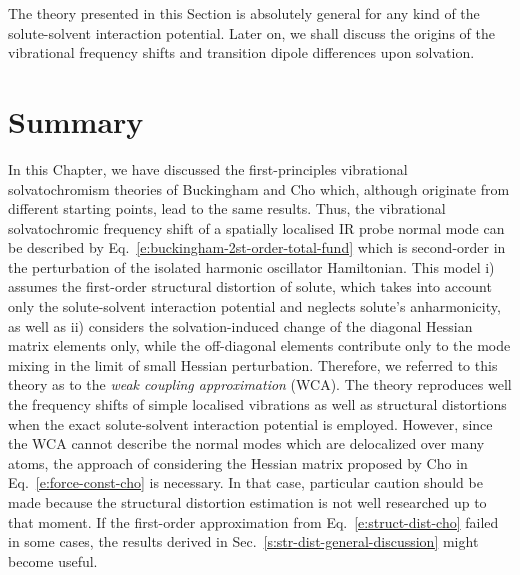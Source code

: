 \documentclass[a4paper,titlepage,twoside,fleqn,12pt]{book}
\begin{document}
\begin{refsection}
The theory presented in this Section is absolutely general 
for any kind of the solute\hyp{}solvent
interaction potential. Later on, we shall discuss the origins of the
vibrational frequency shifts and transition dipole differences
upon solvation.


\section{Summary}

In this Chapter, we have discussed the first\hyp{}principles
vibrational solvatochromism theories of Buckingham and Cho which,
although originate from different starting points, lead to the same results.
Thus, the vibrational solvatochromic frequency shift of a spatially localised 
IR probe normal mode can be described by Eq.~\eqref{e:buckingham-2st-order-total-fund}
which is second\hyp{}order in the perturbation of the isolated harmonic oscillator Hamiltonian.
This model i) assumes the first\hyp{}order structural distortion of solute, which takes 
into account only the solute\hyp{}solvent interaction potential and neglects
solute's anharmonicity, as well as ii) considers the solvation\hyp{}induced change of the diagonal
Hessian matrix elements only, while the off\hyp{}diagonal elements
contribute only to the mode mixing in the limit of small Hessian perturbation. 
Therefore, we referred to this theory
as to the \emph{weak coupling approximation} (WCA). The theory reproduces well the frequency shifts of
simple localised vibrations as well as structural distortions
when the exact solute\hyp{}solvent interaction potential
is employed. However, since the WCA cannot describe the normal modes
which are delocalized over many atoms, the approach of considering
the Hessian matrix proposed by Cho in Eq.~\eqref{e:force-const-cho} is necessary. 
In that case, particular caution should be made because the structural
distortion estimation is not well researched up to that moment. If the
first-order approximation from Eq.~\eqref{e:struct-dist-cho} failed in some cases, the results 
derived in Sec.~\ref{s:str-dist-general-discussion} might become useful.

\printbibliography[heading=subbibintoc,title={References}]
\end{refsection}
\end{document}
